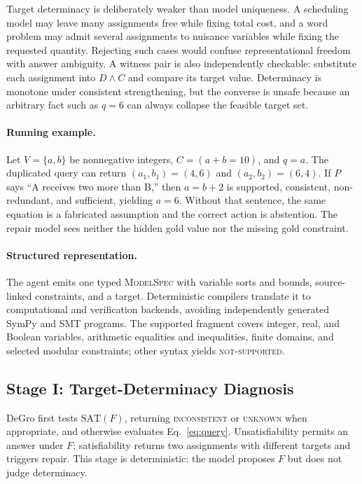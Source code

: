 \documentclass[sigconf,anonymous]{aamas}
\begin{document}
Target determinacy is deliberately weaker than model uniqueness.  A scheduling model may leave many assignments free while fixing total cost, and a word problem may admit several assignments to nuisance variables while fixing the requested quantity.  Rejecting such cases would confuse representational freedom with answer ambiguity.  A witness pair is also independently checkable: substitute each assignment into $D\land C$ and compare its target value.  Determinacy is monotone under consistent strengthening, but the converse is unsafe because an arbitrary fact such as $q=6$ can always collapse the feasible target set.

\paragraph{Running example.}
Let $V=\{a,b\}$ be nonnegative integers, $C=(a+b=10)$, and $q=a$.  The duplicated query can return $(a_1,b_1)=(4,6)$ and $(a_2,b_2)=(6,4)$.  If $P$ says ``A receives two more than B,'' then $a=b+2$ is supported, consistent, non-redundant, and sufficient, yielding $a=6$.  Without that sentence, the same equation is a fabricated assumption and the correct action is abstention.  The repair model sees neither the hidden gold value nor the missing gold constraint.

\paragraph{Structured representation.}
The agent emits one typed \textsc{ModelSpec} with variable sorts and bounds, source-linked constraints, and a target.  Deterministic compilers translate it to computational and verification backends, avoiding independently generated SymPy and SMT programs.  The supported fragment covers integer, real, and Boolean variables, arithmetic equalities and inequalities, finite domains, and selected modular constraints; other syntax yields \textsc{not-supported}.

\subsection{Stage I: Target-Determinacy Diagnosis}
DeGro first tests $\mathrm{SAT}(F)$, returning \textsc{inconsistent} or \textsc{unknown} when appropriate, and otherwise evaluates Eq.~\eqref{eq:query}.  Unsatisfiability permits an answer under $F$; satisfiability returns two assignments with different targets and triggers repair.  This stage is deterministic: the model proposes $F$ but does not judge determinacy.
\end{document}
